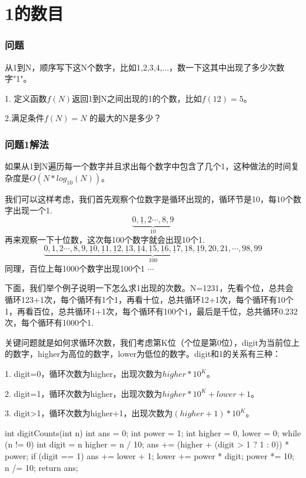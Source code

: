 \section{1的数目} %
\label{sec:number-of-ones-in-sequence}

\subsubsection{问题}
从1到N，顺序写下这N个数字，比如1,2,3,4,...，数一下这其中出现了多少次数字"1"。

1. 定义函数$f(N)$返回1到N之间出现的1的个数，比如$f(12)=5$。

2.满足条件$f(N) = N$ 的最大的N是多少？

\subsubsection{问题1解法}
如果从1到N遍历每一个数字并且求出每个数字中包含了几个1，这种做法的时间复杂度是$O(N*log_{10}(N))$。

我们可以这样考虑，我们首先观察个位数字是循环出现的，循环节是10，每10个数字出现一个1.
\[\underbrace {0, \underline{1}, 2 \cdots , 8, 9}_{10}\]
再来观察一下十位数，这次每100个数字就会出现10个1.
\[\underbrace {0, 1, 2 \cdots , 8, 9, \underline{1}0, \underline{1}1, \underline{1}2, \underline{1}3, \underline{1}4, \underline{1}5, \underline{1}6, \underline{1}7, \underline{1}8, \underline{1}9, 20, 21, \cdots , 98, 99}_{100}\]
同理，百位上每1000个数字出现100个1 $\cdots$

下面，我们举个例子说明一下怎么求1出现的次数。N=1231，先看个位，总共会循环123+1次，每个循环有1个1，再看十位，总共循环12+1次，每个循环有10个1，再看百位，总共循环1+1次，每个循环有100个1，最后是千位，总共循环0.232次，每个循环有1000个1.

关键问题就是如何求循环次数，我们考虑第K位（个位是第0位），digit为当前位上的数字，higher为高位的数字，lower为低位的数字。digit和1的关系有三种：

1. digit=0，循环次数为higher，出现次数为$higher*10^K$。

2. digit=1，循环次数为higher，出现次数为$higher*10^K+lower+1$。

3. digit>1，循环次数为higher+1，出现次数为$(higher+1)*10^K$。


\begin{Codex}[label={[$O(log10(N))+O(1)$]Chap02_04_Ones.java}]
	int digitCounts(int n) {
		int ans = 0;
		int power = 1;
		int higher = 0, lower = 0;
		while (n != 0) {
			int digit = n %
			higher = n / 10;
			ans += (higher + (digit > 1 ? 1 : 0)) * power;
			if (digit == 1) {
				ans += lower + 1;
			}
			lower += power * digit;
			power *= 10;
			n /= 10;
		}
		return ans;
	}
\end{Codex}


